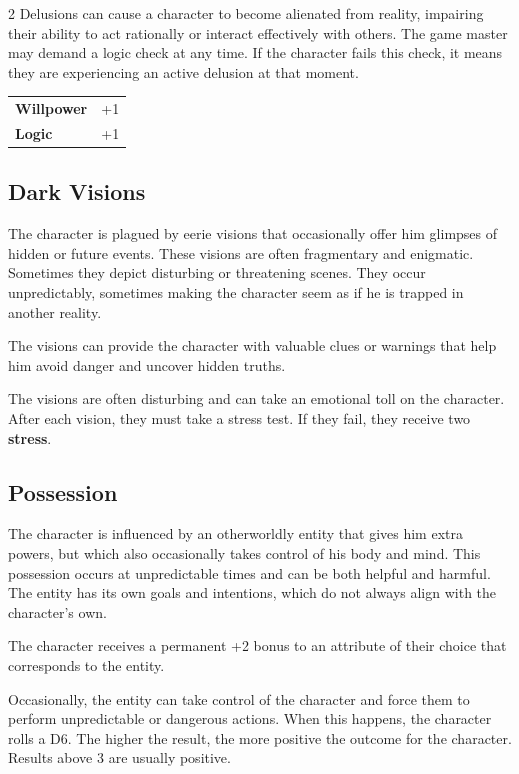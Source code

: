 \begin{multicols}{2}
    Delusions can cause a character to become alienated from reality, impairing their ability to act rationally or interact effectively with others. The game master may demand a logic check at any time. If the character fails this check, it means they are experiencing an active delusion at that moment.

    \begin{tabular}{@{}ll@{}}
        \textbf{Willpower} & +1\\
        \textbf{Logic} & +1\\
    \end{tabular}

    \subsection*{Dark Visions}

    The character is plagued by eerie visions that occasionally offer him glimpses of hidden or future events. These visions are often fragmentary and enigmatic. Sometimes they depict disturbing or threatening scenes. They occur unpredictably, sometimes making the character seem as if he is trapped in another reality.

    The visions can provide the character with valuable clues or warnings that help him avoid danger and uncover hidden truths.

    The visions are often disturbing and can take an emotional toll on the character. After each vision, they must take a stress test. If they fail, they receive two \textbf{stress}.


    \subsection*{Possession}

    The character is influenced by an otherworldly entity that gives him extra powers, but which also occasionally takes control of his body and mind. This possession occurs at unpredictable times and can be both helpful and harmful. The entity has its own goals and intentions, which do not always align with the character's own.

    The character receives a permanent +2 bonus to an attribute of their choice that corresponds to the entity.

    Occasionally, the entity can take control of the character and force them to perform unpredictable or dangerous actions. When this happens, the character rolls a D6. The higher the result, the more positive the outcome for the character. Results above 3 are usually positive.



\end{multicols}
